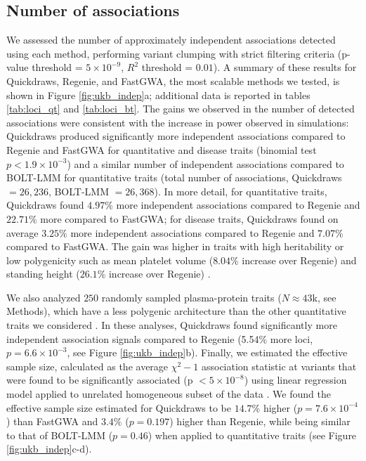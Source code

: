 \clearpage

\subsection{Number of associations}
We assessed the number of approximately independent associations detected using each method, performing variant clumping with strict filtering criteria (p-value threshold = $5 \times 10^{-9}$, $R^2$ threshold = $0.01$).
%
A summary of these results for Quickdraws, Regenie, and FastGWA, the most scalable methods we tested, is shown in Figure \ref{fig:ukb_indep}a; additional data is reported in tables \ref{tab:loci_qt} and \ref{tab:loci_bt}. 
%
The gains we observed in the number of detected associations were consistent with the increase in power observed in simulations: Quickdraws produced significantly more independent associations compared to Regenie and FastGWA for quantitative and disease traits (binomial test $p < 1.9 \times 10^{-3}$) and a similar number of independent associations compared to BOLT-LMM for quantitative traits (total number of associations, Quickdraws $=26{,}236$, BOLT-LMM $=26{,}368$).
%
In more detail, for quantitative traits, Quickdraws found $4.97\%$ more independent associations compared to Regenie and $22.71\%$ more compared to FastGWA; for disease traits, Quickdraws found on average $3.25\%$ more independent associations compared to Regenie and $7.07\%$ compared to FastGWA.
%
The gain was higher in traits with high heritability or low polygenicity such as mean platelet volume ($8.04\%$ increase over Regenie) and standing height ($26.1\%$ increase over Regenie) \cite{zeng2021widespread}.
%

%
We also analyzed $250$ randomly sampled plasma-protein traits ($N \approx 43$k, see Methods), which have a less polygenic architecture than the other quantitative traits we considered \cite{sun2023plasma}.
%
In these analyses, Quickdraws found significantly more independent association signals compared to Regenie (5.54\% more loci, $p = 6.6 \times 10^{-3}$, see Figure \ref{fig:ukb_indep}b).
%
Finally, we estimated the effective sample size, calculated as the average $\chi^2 - 1$ association statistic at variants that were found to be significantly associated (p $<5 \times 10^{-8}$) using linear regression model applied to unrelated homogeneous subset of the data \cite{yang2011genomic}.
%
We found the effective sample size estimated for Quickdraws to be $14.7\%$ higher ($p = 7.6 \times 10^{-4}$) than FastGWA and $3.4\%$ ($p = 0.197$) higher than Regenie, while being similar to that of BOLT-LMM ($p = 0.46$) when applied to quantitative traits (see Figure \ref{fig:ukb_indep}c-d).
%

